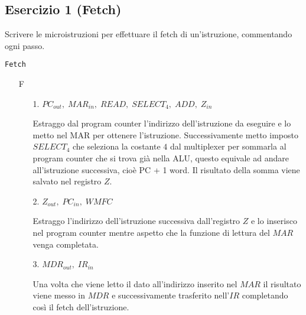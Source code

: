 \documentclass[a4paper]{article}
\theoremstyle{break}
\theoremstyle{break}
\theoremstyle{break}
\theoremstyle{break}
\begin{document}
\subsection{Esercizio 1 (Fetch)}
\begin{exercise}
  Scrivere le microistruzioni per effettuare il fetch di un'istruzione, commentando ogni 
  passo. 
  \begin{center}
    \texttt{Fetch}
  \end{center}

  \begin{enumerate}
    \item [F]
      \begin{enumerate}
        \item[1.] \( PC_{out},\; MAR_{in},\; READ,\; SELECT_4,\; ADD,\; Z_{in} \) 

          \noindent Estraggo dal program counter l'indirizzo dell'istruzione da eseguire e
          lo metto nel MAR per ottenere l'istruzione. Successivamente metto imposto
          \( SELECT_4 \) che seleziona la costante \( 4 \) dal multiplexer per sommarla
          al program counter che si trova già nella ALU, questo equivale ad andare 
          all'istruzione successiva, cioè PC + 1 word. Il risultato della somma
          viene salvato nel registro \( Z \).

        \item[2.] \( Z_{out},\; PC_{in},\; WMFC \) 

          \noindent Estraggo l'indirizzo dell'istruzione successiva dall'registro \( Z \) 
          e lo inserisco nel program counter mentre aspetto che la funzione di lettura
          del \( MAR \) venga completata.

        \item[3.] \( MDR_{out},\; IR_{in} \) 

          \noindent Una volta che viene letto il dato all'indirizzo inserito nel \( MAR \)
          il risultato viene messo in \( MDR \) e successivamente trasferito nell'\( IR \)
          completando così il fetch dell'istruzione.
      \end{enumerate}
  \end{enumerate}
\end{exercise}
\end{document}
